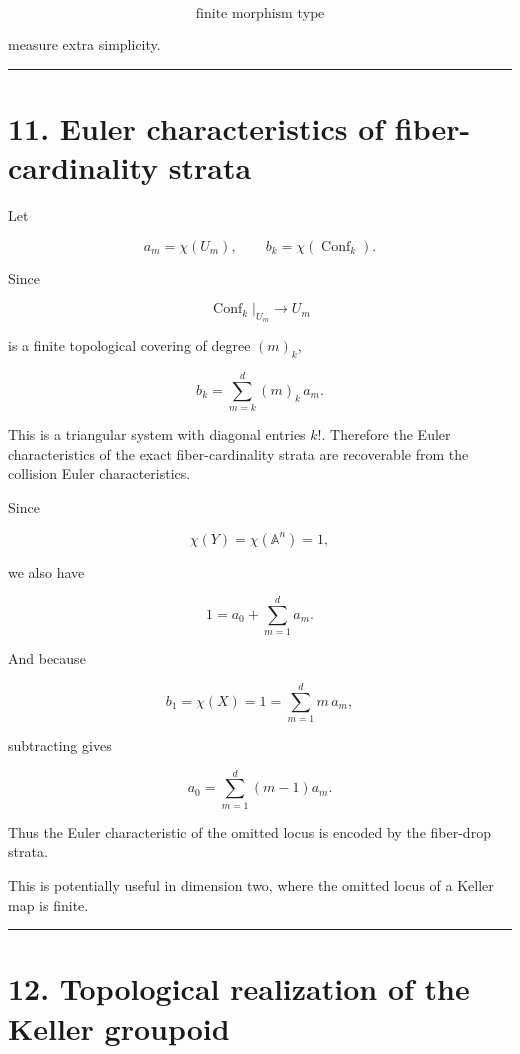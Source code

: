 \[
\text{finite morphism type}
\]

measure extra simplicity.

\begin{center}\rule{0.5\linewidth}{0.5pt}\end{center}

\section{11. Euler characteristics of fiber-cardinality
strata}\label{euler-characteristics-of-fiber-cardinality-strata}

Let

\[
a_m=\chi(U_m),
\qquad
b_k=\chi(\operatorname{Conf}_k).
\]

Since

\[
\operatorname{Conf}_k|_{U_m}\to U_m
\]

is a finite topological covering of degree \((m)_k\),

\[
\boxed{
b_k
=
\sum_{m=k}^d (m)_k\,a_m.
}
\]

This is a triangular system with diagonal entries \(k!\). Therefore the
Euler characteristics of the exact fiber-cardinality strata are
recoverable from the collision Euler characteristics.

Since

\[
\chi(Y)=\chi(\mathbb A^n)=1,
\]

we also have

\[
1
=
a_0+\sum_{m=1}^d a_m.
\]

And because

\[
b_1=\chi(X)=1
=
\sum_{m=1}^d m\,a_m,
\]

subtracting gives

\[
\boxed{
a_0
=
\sum_{m=1}^d (m-1)a_m.
}
\]

Thus the Euler characteristic of the omitted locus is encoded by the
fiber-drop strata.

This is potentially useful in dimension two, where the omitted locus of
a Keller map is finite.

\begin{center}\rule{0.5\linewidth}{0.5pt}\end{center}

\section{12. Topological realization of the Keller
groupoid}\label{topological-realization-of-the-keller-groupoid}

